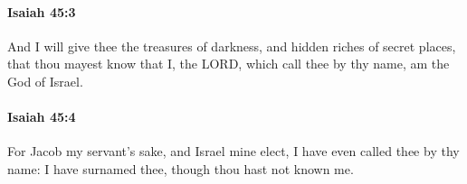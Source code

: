		\paragraph{Isaiah 45:3} %
			\label{ISAIAH-45-3}

			And I will give thee the treasures of darkness, and hidden riches of secret places, that thou mayest know that I, the LORD, which call thee by thy name, am the God of Israel.


		\paragraph{Isaiah 45:4} %
			\label{ISAIAH-45-4}

			For Jacob my servant's sake, and Israel mine elect, I have even called thee by thy name: I have surnamed thee, though thou hast not known me.


